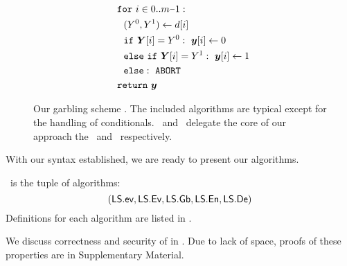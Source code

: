 \begin{figure}
\begin{adjustwidth}{-0.1\textwidth}{-0.1\textwidth}
\begin{minipage}[t]{0.40\linewidth}
\begin{align*}
      &~~\cfor~i \in 0.. m\minus 1:\\
      &~~~~(Y^0, Y^1) \gets d[i]\\
      &~~~~\cif~\gcirout[i] = Y^0:~\cirout[i] \gets 0\\
      &~~~~\celse~\cif~\gcirout[i] = Y^1:~\cirout[i] \gets 1\\
      &~~~~\celse:~\mathtt{ABORT}\\
      &~~\creturn~\cirout
    \end{align*}
  \end{minipage}
  \end{adjustwidth}
  \caption{%
    Our garbling scheme \ourschemelong.
    The included algorithms are typical except for the handling of
    conditionals.
    \gEv\ and \gGb\ delegate the core of our approach the \evcond\ and
    \gbcond\ respectively.
  }\label{fig:scheme}
\end{figure}


With our syntax established, we are ready to present our algorithms.
\begin{construction}[\ourschemelong]\label{ourconstr}
  \ourschemelong\ is the tuple of algorithms:
  \[ (\textsf{LS}.\textsf{ev}, \textsf{LS}.\textsf{Ev}, \textsf{LS}.\textsf{Gb}, \textsf{LS}.\textsf{En}, \textsf{LS}.\textsf{De}) \]
  Definitions for each algorithm are listed in .
\end{construction}

We discuss correctness and security of  in
. Due to lack of space, proofs of these properties are
in Supplementary Material.

